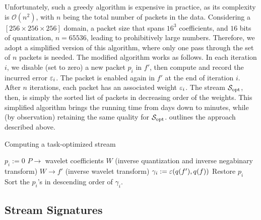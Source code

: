 Unfortunately, such a greedy algorithm is expensive in practice, as its
complexity is $\mathcal{O}(n^2)$, with $n$ being the total number of packets in
the data.  Considering a $[256 \times 256 \times 256]$ domain,  a packet size
that spans $16^3$ coefficients, and $16$ bits of quantization, $n = 65536$,
leading to prohibitively large numbers. Therefore, we adopt a simplified version
of this algorithm, where only one pass through the set of $n$ packets is
needed.  The modified algorithm works as follows. In each iteration $i$, we
disable (set to zero) a new packet $p_i$ in $f'$, then compute and record the
incurred error $\err_i$. The packet is enabled again in $f'$ at the end of
iteration $i$. After $n$ iterations, each packet has an associated weight
$\err_i$.  The stream $\sopt$, then, is simply the sorted list of packets in
decreasing order of the weights. This simplified algorithm brings the running
time from days down to minutes, while (by observation) retaining the same
quality for $\sopt$.  outlines the approach described above.

\begin{algorithm}[h]
  \small
  \caption{Computing a task-optimized stream}
  \begin{algorithmic}[1]
			\State $p_i := 0$
      \State $P \rightarrow$ wavelet coefficients $W$ (inverse quantization and inverse negabinary transform)
			\State $W \rightarrow f'$ (inverse wavelet transform)
			\State $\gamma_i := \err(q(f'),q(f))$			
			\State Restore $p_i$
		\EndFor
		\State Sort the $p_i$'s in descending order of $\gamma_i$.
	\end{algorithmic}
	\label{alg:greedy}
\end{algorithm}

\subsection{Stream Signatures} \label{sec:stream-signature}


